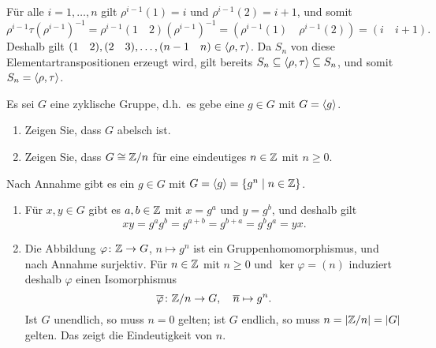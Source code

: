 \begin{solution}
  Für alle $i = 1, \dotsc, n$ gilt $\rho^{i-1}(1) = i$ und $\rho^{i-1}(2) = i+1$, und somit
  \[
    \rho^{i-1} \tau (\rho^{i-1})^{-1}
    = \rho^{i-1} (1 \quad 2) (\rho^{i-1})^{-1}
    = (\rho^{i-1}(1) \quad \rho^{i-1}(2))
    = (i \quad i+1).
  \]
  Deshalb gilt $(1 \quad 2), (2 \quad 3), \dotsc, (n-1 \quad n) \in \left\langle \rho, \tau \right\rangle$.
  Da $S_n$ von diese Elementartranspositionen erzeugt wird, gilt bereits $S_n \subseteq \left\langle \rho, \tau \right\rangle \subseteq S_n$, und somit $S_n = \left\langle \rho, \tau \right\rangle$.
\end{solution}


\begin{question}[subtitle = Klassifikation zyklischer Gruppen]
  Es sei $G$ eine zyklische Gruppe, d.h.\ es gebe eine $g \in G$ mit $G = \left\langle g \right\rangle$.
  \begin{enumerate}
    \item
      Zeigen Sie, dass $G$ abelsch ist.
    \item
      Zeigen Sie, dass $G \cong \mathbb{Z}/n$ für eine eindeutiges $n \in \mathbb{Z}$ mit $n \geq 0$.
  \end{enumerate}
\end{question}


\begin{solution}
  \label{question: classification of cyclic groups}
  Nach Annahme gibt es ein $g \in G$ mit $G = \left\langle g \right\rangle = \{g^n \mid n \in \mathbb{Z}\}$.
  \begin{enumerate}
    \item
      Für $x, y \in G$ gibt es $a, b \in \mathbb{Z}$ mit $x = g^a$ und $y = g^b$, und deshalb gilt
      \[
        xy = g^a g^b = g^{a+b} = g^{b+a} = g^b g^a = yx.
      \]
      
    \item
      Die Abbildung $\varphi \colon \mathbb{Z} \to G$, $n \mapsto g^n$ ist ein Gruppenhomomorphismus, und nach Annahme surjektiv.
      Für $n \in \mathbb{Z}$ mit $n \geq 0$ und $\ker \varphi = (n)$ induziert deshalb $\varphi$ einen Isomorphismus
      \[
        \overline{\varphi} \colon \mathbb{Z}/n \to G,
        \quad
        \overline{n} \mapsto g^n.
      \]
      Ist $G$ unendlich, so muss $n = 0$ gelten;
      ist $G$ endlich, so muss $n = |\mathbb{Z}/n| = |G|$ gelten.
      Das zeigt die Eindeutigkeit von $n$.
  \end{enumerate}
\end{solution}



